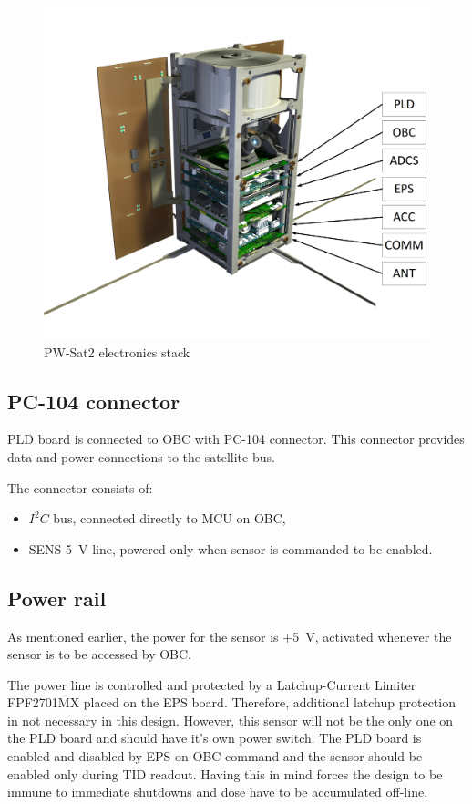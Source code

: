         \begin{figure}[H]
            \centering
            \includegraphics[width=0.7\paperwidth]{img/PW-Sat2-stack.png}
            \caption{PW-Sat2 electronics stack}
            \label{PW-Sat2_stack}
        \end{figure}

    \subsection{PC-104 connector}
        PLD board is connected to OBC with PC-104 connector. This connector provides data and power connections to the satellite bus.

        The connector consists of:
        \begin{itemize}
            \item $I^2C$ bus, connected directly to MCU on OBC,
            \item SENS \SI{5}{\volt} line, powered only when sensor is commanded to be enabled.
        \end{itemize}

    \subsection{Power rail}
        As mentioned earlier, the power for the sensor is +\SI{5}{\volt}, activated whenever the sensor is to be accessed by OBC.

        The power line is controlled and protected by a Latchup-Current Limiter FPF2701MX placed on the EPS board. Therefore, additional latchup protection in not necessary in this design. However, this sensor will not be the only one on the PLD board and should have it's own power switch. The PLD board is enabled and disabled by EPS on OBC command and the sensor should be enabled only during TID readout. Having this in mind forces the design to be immune to immediate shutdowns and dose have to be accumulated off-line.

